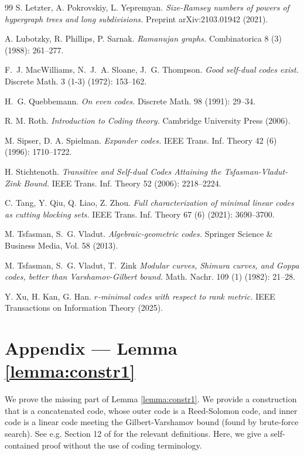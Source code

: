 \documentclass[11pt]{article}
\theoremstyle{plain}
\theoremstyle{definition}
\begin{document}
\begin{thebibliography}{99}
S. Letzter, A. Pokrovskiy, L. Yepremyan.
\emph{Size-Ramsey numbers of powers of hypergraph trees and long subdivisions.}
Preprint arXiv:2103.01942 (2021).

A. Lubotzky, R. Phillips, P. Sarnak.
\emph{Ramanujan graphs.}
Combinatorica 8 (3) (1988): 261--277.

F.~J. MacWilliams, N.~J.~A. Sloane, J.~G. Thompson.
\emph{Good self-dual codes exist.}
Discrete Math. 3 (1-3) (1972): 153--162.

H.~G. Quebbemann.
\emph{On even codes.}
Discrete Math. 98 (1991): 29--34.

R. M. Roth.
\emph{Introduction to Coding theory.}
Cambridge University Press (2006).

M. Sipser, D. A. Spielman.
\emph{Expander codes.}
IEEE Trans. Inf. Theory 42 (6) (1996): 1710--1722.


H. Stichtenoth.
\emph{Transitive and Self-dual Codes Attaining the Tsfasman-Vladut-Zink Bound.}
IEEE Trans. Inf. Theory 52 (2006): 2218--2224.

C. Tang, Y. Qiu, Q. Liao, Z. Zhou.
\emph{Full characterization of minimal linear codes as cutting blocking sets.}
IEEE Trans. Inf. Theory 67 (6) (2021): 3690--3700.



M. Tsfasman, S.~G. Vladut.
\emph{Algebraic-geometric codes.}
Springer Science \& Business Media, Vol. 58 (2013).

M. Tsfasman, S.~G. Vladut, T.~Zink
\emph{Modular curves, Shimura curves, and Goppa codes, better than Varshamov-Gilbert bound.}
Math. Nachr. 109 (1) (1982): 21--28.


Y. Xu, H. Kan, G. Han.
\emph{\( r \)-minimal codes with respect to rank metric.}
IEEE Transactions on Information Theory (2025).


\end{thebibliography}


\section*{Appendix --- Lemma \ref{lemma:constr1}}

We prove the missing part of Lemma \ref{lemma:constr1}. We provide a construction that is a concatenated code, whose outer code is a Reed-Solomon code, and inner code is a linear code meeting the Gilbert-Varshamov bound (found by brute-force search). See e.g. Section 12 of \cite{Roth} for the relevant definitions. Here, we give a self-contained proof without the use of coding terminology.
\end{document}

